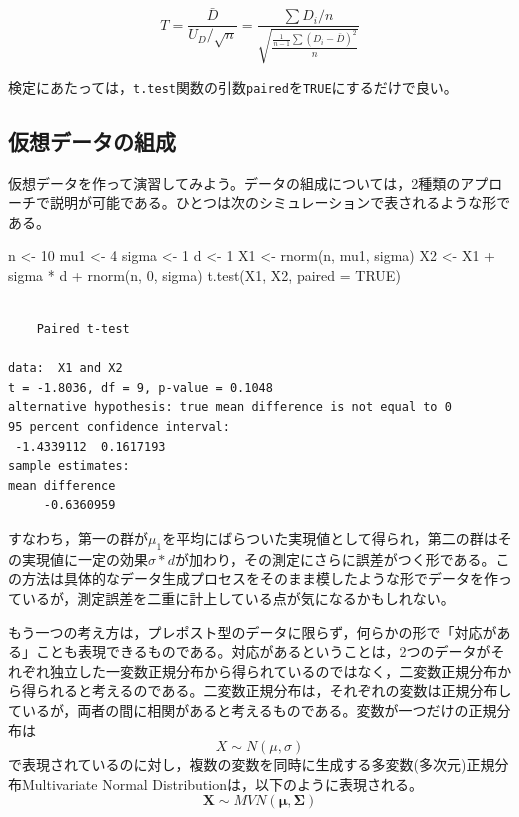 \documentclass[
  a4paper,
]{ltjsbook}
\newenvironment{Shaded}{\begin{snugshade}}{\end{snugshade}}
\newcommand{\AttributeTok}[1]{\textcolor[rgb]{0.40,0.45,0.13}{#1}}
\newcommand{\ConstantTok}[1]{\textcolor[rgb]{0.56,0.35,0.01}{#1}}
\newcommand{\DecValTok}[1]{\textcolor[rgb]{0.68,0.00,0.00}{#1}}
\newcommand{\FunctionTok}[1]{\textcolor[rgb]{0.28,0.35,0.67}{#1}}
\newcommand{\NormalTok}[1]{\textcolor[rgb]{0.00,0.23,0.31}{#1}}
\newcommand{\OtherTok}[1]{\textcolor[rgb]{0.00,0.23,0.31}{#1}}
\newcommand{\SpecialCharTok}[1]{\textcolor[rgb]{0.37,0.37,0.37}{#1}}
\begin{document}
\[ T = \frac{\bar{D}}{U_D/\sqrt{n}} = \frac{\sum D_i/n}{\sqrt{\frac{\frac{1}{n-1}\sum(D_i-\bar{D})^2}{n}}}\]

検定にあたっては，\texttt{t.test}関数の引数\texttt{paired}を\texttt{TRUE}にするだけで良い。

\subsection{仮想データの組成}\label{ux4eeeux60f3ux30c7ux30fcux30bfux306eux7d44ux6210}

仮想データを作って演習してみよう。データの組成については，2種類のアプローチで説明が可能である。ひとつは次のシミュレーションで表されるような形である。

\begin{Shaded}
\begin{Highlighting}[]
\NormalTok{n }\OtherTok{\textless{}{-}} \DecValTok{10}
\NormalTok{mu1 }\OtherTok{\textless{}{-}} \DecValTok{4}
\NormalTok{sigma }\OtherTok{\textless{}{-}} \DecValTok{1}
\NormalTok{d }\OtherTok{\textless{}{-}} \DecValTok{1}
\NormalTok{X1 }\OtherTok{\textless{}{-}} \FunctionTok{rnorm}\NormalTok{(n, mu1, sigma)}
\NormalTok{X2 }\OtherTok{\textless{}{-}}\NormalTok{ X1 }\SpecialCharTok{+}\NormalTok{ sigma }\SpecialCharTok{*}\NormalTok{ d }\SpecialCharTok{+} \FunctionTok{rnorm}\NormalTok{(n, }\DecValTok{0}\NormalTok{, sigma)}
\FunctionTok{t.test}\NormalTok{(X1, X2, }\AttributeTok{paired =} \ConstantTok{TRUE}\NormalTok{)}
\end{Highlighting}
\end{Shaded}

\begin{verbatim}

    Paired t-test

data:  X1 and X2
t = -1.8036, df = 9, p-value = 0.1048
alternative hypothesis: true mean difference is not equal to 0
95 percent confidence interval:
 -1.4339112  0.1617193
sample estimates:
mean difference 
     -0.6360959 
\end{verbatim}

すなわち，第一の群が\(\mu_1\)を平均にばらついた実現値として得られ，第二の群はその実現値に一定の効果\(\sigma *d\)が加わり，その測定にさらに誤差がつく形である。この方法は具体的なデータ生成プロセスをそのまま模したような形でデータを作っているが，測定誤差を二重に計上している点が気になるかもしれない。

もう一つの考え方は，プレポスト型のデータに限らず，何らかの形で「対応がある」ことも表現できるものである。対応があるということは，2つのデータがそれぞれ独立した一変数正規分布から得られているのではなく，二変数正規分布から得られると考えるのである。二変数正規分布は，それぞれの変数は正規分布しているが，両者の間に相関があると考えるものである。変数が一つだけの正規分布は
\[X \sim N(\mu,\sigma)\]
で表現されているのに対し，複数の変数を同時に生成する多変数(多次元)正規分布Multivariate
Normal Distributionは，以下のように表現される。
\[ \mathbf{X} \sim MVN(\mathbf{\mu},\mathbf{\Sigma})\]
\end{document}
